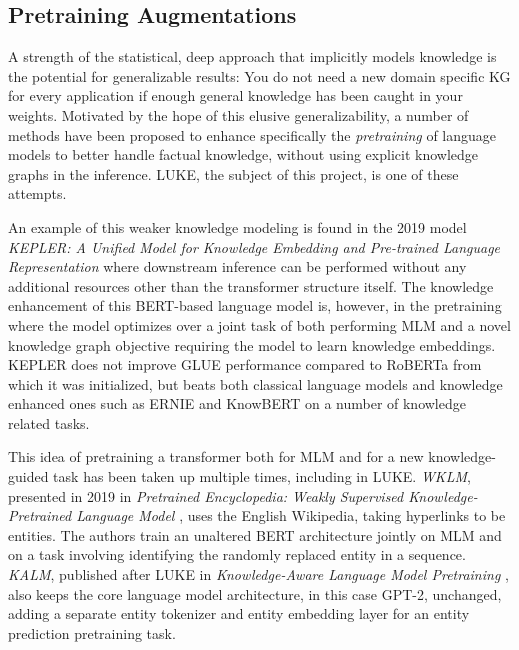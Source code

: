 \documentclass[main.tex]{subfiles}
\begin{document}
\subsection{Pretraining Augmentations}
A strength of the statistical, deep approach that implicitly models knowledge is the potential for generalizable results:
You do not need a new domain specific KG for every application if enough general knowledge has been caught in your weights.
Motivated by the hope of this elusive generalizability, a number of methods have been proposed to enhance specifically the \emph{pretraining} of language models to better handle factual knowledge, without using explicit knowledge graphs in the inference.
LUKE, the subject of this project, is one of these attempts.

An example of this weaker knowledge modeling is found in the 2019 model \emph{KEPLER: A Unified Model for Knowledge Embedding and Pre-trained Language Representation} \cite{wang2021kepler} where downstream inference can be performed without any additional resources other than the transformer structure itself.
The knowledge enhancement of this BERT-based language model is, however, in the pretraining where the model optimizes over a joint task of both performing MLM and a novel knowledge graph objective requiring the model to learn knowledge embeddings.
KEPLER does not improve GLUE performance compared to RoBERTa \cite{liu2019roberta} from which it was initialized, but beats both classical language models and knowledge enhanced ones such as ERNIE and KnowBERT on a number of knowledge related tasks.

This idea of pretraining a transformer both for MLM and for a new knowledge-guided task has been taken up multiple times, including in LUKE.
\emph{WKLM}, presented in 2019 in \emph{Pretrained Encyclopedia: Weakly Supervised Knowledge-Pretrained Language Model} \cite{xiong2019wklm}, uses the English Wikipedia, taking hyperlinks to be entities.
The authors train an unaltered BERT architecture jointly on MLM and on a task involving identifying the randomly replaced entity in a sequence.
\emph{KALM}, published after LUKE in \emph{Knowledge-Aware Language Model Pretraining} \cite{corby2020kalm}, also keeps the core language model architecture, in this case GPT-2, unchanged, adding a separate entity tokenizer and entity embedding layer for an entity prediction pretraining task.
\end{document}
